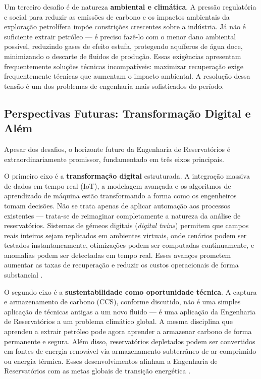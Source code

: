 \documentclass[
  12pt,
  a4paper,
  oneside,
  brazilian,
  sumario=tradicional
]{abntex2}
\begin{document}
Um terceiro desafio é de natureza \textbf{ambiental e climática}. A
pressão regulatória e social para reduzir as emissões de carbono e os
impactos ambientais da exploração petrolífera impõe constrições crescentes
sobre a indústria. Já não é suficiente extrair petróleo — é preciso fazê-lo
com o menor dano ambiental possível, reduzindo gases de efeito estufa,
protegendo aquíferos de água doce, minimizando o descarte de fluidos de
produção. Essas exigências apresentam frequentemente soluções técnicas
incompatíveis: maximizar recuperação exige frequentemente técnicas que
aumentam o impacto ambiental. A resolução dessa tensão é um dos problemas
de engenharia mais sofisticados do período.

\subsection{Perspectivas Futuras: Transformação Digital e Além}

Apesar dos desafios, o horizonte futuro da Engenharia de Reservatórios
é extraordinariamente promissor, fundamentado em três eixos principais.

O primeiro eixo é a \textbf{transformação digital} estruturada. A
integração massiva de dados em tempo real (IoT), a modelagem avançada
e os algoritmos de aprendizado de máquina estão transformando a forma
como os engenheiros tomam decisões. Não se trata apenas de aplicar
automação aos processos existentes — trata-se de reimaginar completamente
a natureza da análise de reservatórios. Sistemas de gémeos digitais
(\textit{digital twins}) permitem que campos reais inteiros sejam
replicados em ambientes virtuais, onde cenários podem ser testados
instantaneamente, otimizações podem ser computadas continuamente, e
anomalias podem ser detectadas em tempo real. Esses avanços prometem
aumentar as taxas de recuperação e reduzir os custos operacionais de
forma substancial \cite{ramos2020}.

O segundo eixo é a \textbf{sustentabilidade como oportunidade técnica}.
A captura e armazenamento de carbono (CCS), conforme discutido, não é
uma simples aplicação de técnicas antigas a um novo fluido — é uma
aplicação da Engenharia de Reservatórios a um problema climático global.
A mesma disciplina que aprendeu a extrair petróleo pode agora aprender
a armazenar carbono de forma permanente e segura. Além disso, reservatórios
depletados podem ser convertidos em fontes de energia renovável via
armazenamento subterrâneo de ar comprimido ou energia térmica. Esses
desenvolvimentos alinham a Engenharia de Reservatórios com as metas
globais de transição energética \cite{bachu2000}.
\end{document}
